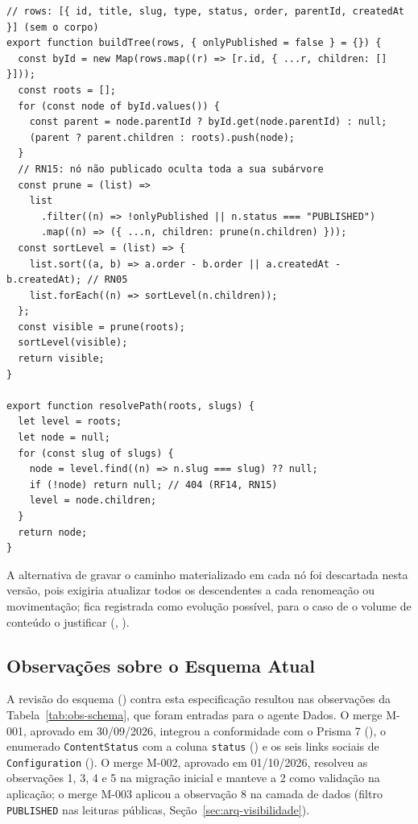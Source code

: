 \begin{lstlisting}[language=VJS, caption={Esboço: montagem da árvore e resolução de caminho}, label={lst:algoritmo-arvore}]
// rows: [{ id, title, slug, type, status, order, parentId, createdAt }] (sem o corpo)
export function buildTree(rows, { onlyPublished = false } = {}) {
  const byId = new Map(rows.map((r) => [r.id, { ...r, children: [] }]));
  const roots = [];
  for (const node of byId.values()) {
    const parent = node.parentId ? byId.get(node.parentId) : null;
    (parent ? parent.children : roots).push(node);
  }
  // RN15: nó não publicado oculta toda a sua subárvore
  const prune = (list) =>
    list
      .filter((n) => !onlyPublished || n.status === "PUBLISHED")
      .map((n) => ({ ...n, children: prune(n.children) }));
  const sortLevel = (list) => {
    list.sort((a, b) => a.order - b.order || a.createdAt - b.createdAt); // RN05
    list.forEach((n) => sortLevel(n.children));
  };
  const visible = prune(roots);
  sortLevel(visible);
  return visible;
}

export function resolvePath(roots, slugs) {
  let level = roots;
  let node = null;
  for (const slug of slugs) {
    node = level.find((n) => n.slug === slug) ?? null;
    if (!node) return null; // 404 (RF14, RN15)
    level = node.children;
  }
  return node;
}
\end{lstlisting}

A alternativa de gravar o caminho materializado em cada nó foi descartada nesta versão, pois exigiria atualizar todos os descendentes a cada renomeação ou movimentação; fica registrada como evolução possível, para o caso de o volume de conteúdo o justificar (, ).

\subsection{Observações sobre o Esquema Atual}\label{sec:arq-observacoes-schema}

A revisão do esquema () contra esta especificação resultou nas observações da Tabela~\ref{tab:obs-schema}, que foram entradas para o agente Dados. O merge M-001, aprovado em 30/09/2026, integrou a conformidade com o Prisma 7 (), o enumerado \texttt{ContentStatus} com a coluna \texttt{status} () e os seis links sociais de \texttt{Configuration} (). O merge M-002, aprovado em 01/10/2026, resolveu as observações 1, 3, 4 e 5 na migração inicial e manteve a 2 como validação na aplicação; o merge M-003 aplicou a observação 8 na camada de dados (filtro \texttt{PUBLISHED} nas leituras públicas, Seção~\ref{sec:arq-visibilidade}).

